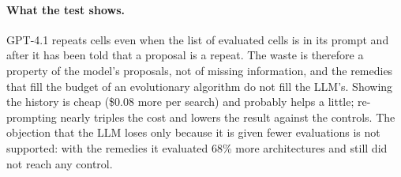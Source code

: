 \documentclass[preprint,12pt]{elsarticle}
\begin{document}
\paragraph{What the test shows.} GPT-4.1 repeats cells even when the list of evaluated cells is in its prompt and after it has been told that a proposal is a repeat. The waste is therefore a property of the model's proposals, not of missing information, and the remedies that fill the budget of an evolutionary algorithm do not fill the LLM's. Showing the history is cheap (\$0.08 more per search) and probably helps a little; re-prompting nearly triples the cost and lowers the result against the controls. The objection that the LLM loses only because it is given fewer evaluations is not supported: with the remedies it evaluated 68\% more architectures and still did not reach any control.
\end{document}
